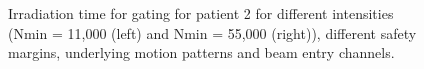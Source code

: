 \documentclass[type=dr, dr=rernat, accentcolor=tud7b,colorbacktitle, bigchapter, openright, twoside, 12pt ]{tudthesis}
\begin{document}
 \begin{figure}[H]
\caption{Irradiation time for gating for patient 2 for different intensities (Nmin = 11,000 (left) and Nmin = 55,000 (right)), different 
safety margins, underlying motion patterns and beam entry channels.}
\label{irrTime_gating_Pat024}
\end{figure}



\newpage
\end{document}
